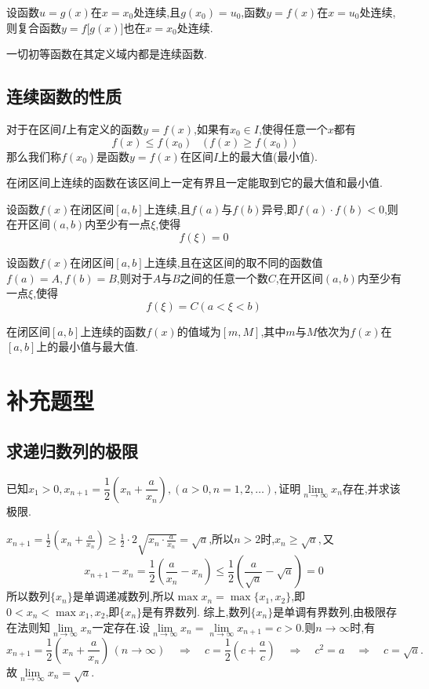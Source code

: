 \warn
[
\kg $g(x)$可以不在点$x=x_0$处有连续,但是必须有极限.
]

\theorem[复合函数的连续性\uppercase\expandafter{\romannumeral2}]
设函数$u=g(x)$在$x=x_0$处连续,且$g(x_0)=u_0$,函数$y=f(x)$在$x=u_0$处连续,则复合函数$y=f\big[g(x)\big]$也在$x=x_0$处连续.\jg

\theorem[初等函数的连续性]
一切初等函数在其定义域内都是连续函数.\jg

\subsection{连续函数的性质}
	
	对于在区间$I$上有定义的函数$y=f(x)$,如果有$x_0 \in I$,使得任意一个$x$都有
	\[
	f(x)\le f(x_0)\quad\big(\,f(x) \geq f(x_0) \,\big)
	\]
	那么我们称$f(x_0)$是函数$y=f(x)$在区间$I$上的最大值(最小值).
	\jg
	
	\theorem[最大值最小值定理]
	在闭区间上连续的函数在该区间上一定有界且一定能取到它的最大值和最小值.
	


	\theorem[零点存在性定理]
	设函数$f(x)$在闭区间$[a,b]$上连续,且$f(a)$与$f(b)$异号,即$f(a)\cdot f(b)<0$,则在开区间$(a,b)$内至少有一点$\xi$,使得
	\[
	f(\xi)=0
	\]

	\theorem[介值定理]
	设函数$f(x)$在闭区间$[a,b]$上连续,且在这区间的取不同的函数值$f(a)=A,f(b)=B$,则对于$A$与$B$之间的任意一个数$C$,在开区间$(a,b)$内至少有一点$\xi$,使得
	\[
	f(\xi)=C(a<\xi<b)
	\]
	
	\tl 在闭区间$[a,b]$上连续的函数$f(x)$的值域为$[m,M]$,其中$m$与$M$依次为$f(x)$在$[a,b]$上的最小值与最大值.

\section{补充题型}
\subsection{求递归数列的极限}
\texample[求递归数列的极限]\sj
\examples 已知$x_1>0,x_{n+1}=\dfrac{1}{2}\left(x_n+\dfrac{a}{x_n}\right),(a>0,n=1,2,\ldots),$证明$\lim\limits_{n \to \infty} x_n$存在,并求该极限.

\solve $\displaystyle x_{n+1}=\frac 12\left(x_n+\frac{a}{x_n}\right)\ge \frac 12 \cdot 2\sqrt{x_n\cdot \frac{a}{x_n}}=\sqrt{a}$,所以$n>2$时,$x_n \ge \sqrt{a},$又
\[
x_{n+1}-x_n=\frac{1}{2}\left(\frac{a}{x_n}-x_n\right)\le\frac{1}{2}\left(\frac{a}{\sqrt{a}}-\sqrt{a}\right)=0
\]
所以数列$\{x_n\}$是单调递减数列,所以$\max x_n=\max\{x_1,x_2\}$,即$0<x_n<\max{x_1,x_2}$,即$\{x_n\}$是有界数列.
综上,数列$\{x_n\}$是单调有界数列,由极限存在法则知$\lim\limits_{n \to \infty}x_n$一定存在.设$\lim\limits_{n \to \infty}x_n=\lim\limits_{n \to \infty}x_{n+1}=c>0.$则$n \to \infty$时,有
\[
x_{n+1}=\frac{1}{2}\left(x_n+\frac{a}{x_n}\right)\,(n \to \infty) \quad \Rightarrow \quad c=\frac 12\left( c+\frac ac \right) \quad \Rightarrow \quad c^2=a \quad \Rightarrow \quad c=\sqrt{a}. 
\]
故$\lim\limits_{n \to \infty}x_n=\sqrt{a}.$

